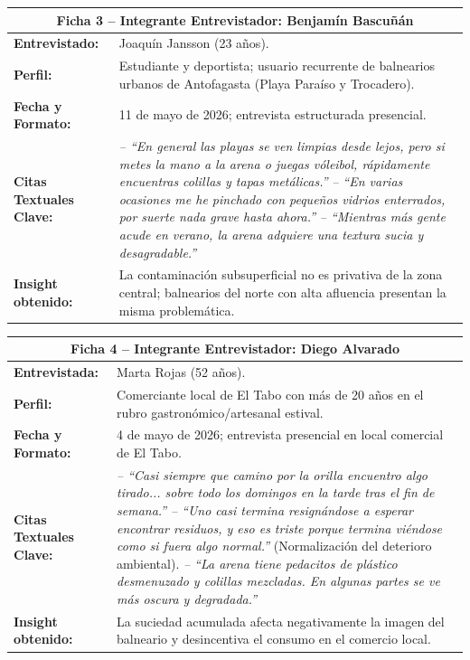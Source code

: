 \documentclass[12pt,letterpaper]{article}
\begin{document}
\begin{table}[h!]
\centering
\small
{}
\begin{tabularx}{\textwidth}{p{3.2cm}X}
\toprule
\multicolumn{2}{c}{\textbf{Ficha 3 -- Integrante Entrevistador: Benjamín Bascuñán}} \\
\midrule
\textbf{Entrevistado:} & Joaquín Jansson (23 años). \\
\textbf{Perfil:} & Estudiante y deportista; usuario recurrente de balnearios urbanos de Antofagasta (Playa Paraíso y Trocadero). \\
\textbf{Fecha y Formato:} & 11 de mayo de 2026; entrevista estructurada presencial. \\
\textbf{Citas Textuales Clave:} & 
\textit{-- ``En general las playas se ven limpias desde lejos, pero si metes la mano a la arena o juegas vóleibol, rápidamente encuentras colillas y tapas metálicas.''} \newline
\textit{-- ``En varias ocasiones me he pinchado con pequeños vidrios enterrados, por suerte nada grave hasta ahora.''} \newline
\textit{-- ``Mientras más gente acude en verano, la arena adquiere una textura sucia y desagradable.''} \\
\textbf{Insight obtenido:} & La contaminación subsuperficial no es privativa de la zona central; balnearios del norte con alta afluencia presentan la misma problemática. \\
\bottomrule
\end{tabularx}
\end{table}

\begin{table}[h!]
\centering
\small
{}
\begin{tabularx}{\textwidth}{p{3.2cm}X}
\toprule
\multicolumn{2}{c}{\textbf{Ficha 4 -- Integrante Entrevistador: Diego Alvarado}} \\
\midrule
\textbf{Entrevistada:} & Marta Rojas (52 años). \\
\textbf{Perfil:} & Comerciante local de El Tabo con más de 20 años en el rubro gastronómico/artesanal estival. \\
\textbf{Fecha y Formato:} & 4 de mayo de 2026; entrevista presencial en local comercial de El Tabo. \\
\textbf{Citas Textuales Clave:} & 
\textit{-- ``Casi siempre que camino por la orilla encuentro algo tirado... sobre todo los domingos en la tarde tras el fin de semana.''} \newline
\textit{-- ``Uno casi termina resignándose a esperar encontrar residuos, y eso es triste porque termina viéndose como si fuera algo normal.''} (Normalización del deterioro ambiental). \newline
\textit{-- ``La arena tiene pedacitos de plástico desmenuzado y colillas mezcladas. En algunas partes se ve más oscura y degradada.''} \\
\textbf{Insight obtenido:} & La suciedad acumulada afecta negativamente la imagen del balneario y desincentiva el consumo en el comercio local. \\
\bottomrule
\end{tabularx}
\end{table}
\end{document}
